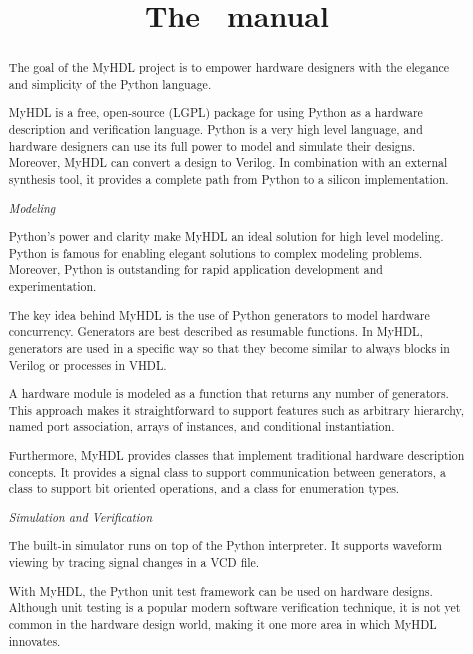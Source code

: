 \documentclass{manual}
\title{The \myhdl\ manual}
\newcommand{\myhdl}{\protect \mbox{MyHDL}}
\begin{document}
\maketitle



\begin{abstract}

\noindent

The goal of the \myhdl{} project is to empower hardware designers with
the elegance and simplicity of the Python language.

\myhdl{} is a free, open-source (LGPL) package for using Python as a
hardware description and verification language. Python is a very high
level language, and hardware designers can use its full power to model
and simulate their designs. Moreover, \myhdl{} can convert a design to
Verilog. In combination with an external synthesis tool, it provides a
complete path from Python to a silicon implementation.

\emph{Modeling}


Python's power and clarity make \myhdl{} an ideal solution for high level
modeling. Python is famous for enabling elegant solutions to complex
modeling problems. Moreover, Python is outstanding for rapid
application development and experimentation.

The key idea behind \myhdl{} is the use of Python generators to model
hardware concurrency. Generators are best described as resumable
functions. In \myhdl{}, generators are used in a specific way so that
they become similar to always blocks in Verilog or processes in VHDL.

A hardware module is modeled as a function that returns any number of
generators. This approach makes it straightforward to support features
such as arbitrary hierarchy, named port association, arrays of
instances, and conditional instantiation.

Furthermore, \myhdl{} provides classes that implement traditional
hardware description concepts. It provides a signal class to support
communication between generators, a class to support bit oriented
operations, and a class for enumeration types.

\emph{Simulation and Verification}

The built-in simulator runs on top of the Python interpreter. It
supports waveform viewing by tracing signal changes in a VCD file.

With \myhdl{}, the Python unit test framework can be used on hardware
designs. Although unit testing is a popular modern software
verification technique, it is not yet common in the hardware design
world, making it one more area in which \myhdl{} innovates.


\end{abstract}
\end{document}
